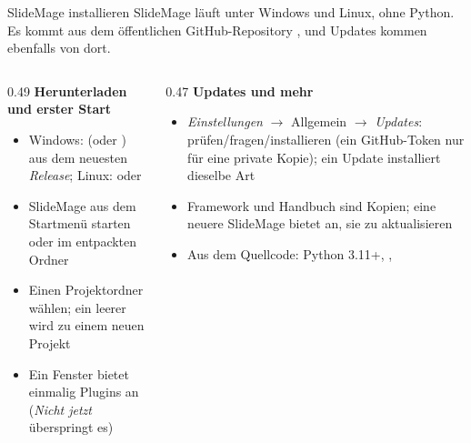

\begin{standardframe}{SlideMage installieren}
	\small
	SlideMage läuft unter Windows und Linux, ohne Python. Es kommt aus dem öffentlichen
	GitHub-Repository , und Updates kommen ebenfalls von dort.
	\par\medskip
	\begin{columns}[T,onlytextwidth]
		\begin{column}{0.49\linewidth}
			\textbf{Herunterladen und erster Start}
			\begin{itemize}
				\item Windows:  (oder ) aus dem neuesten \emph{Release}; Linux:  oder 
				\item SlideMage aus dem Startmenü starten oder  im entpackten Ordner
				\item Einen Projektordner wählen; ein leerer wird zu einem neuen Projekt
				\item Ein Fenster bietet einmalig Plugins an (\emph{Nicht jetzt} überspringt es)
			\end{itemize}
		\end{column}
		\begin{column}{0.47\linewidth}
			\textbf{Updates und mehr}
			\begin{itemize}
				\item \emph{Einstellungen} $\rightarrow$ Allgemein $\rightarrow$ \emph{Updates}: prüfen/fragen/installieren (ein GitHub-Token nur für eine private Kopie); ein Update installiert dieselbe Art
				\item Framework und Handbuch sind Kopien; eine neuere SlideMage bietet an, sie zu aktualisieren
				\item Aus dem Quellcode: Python 3.11+, , 
			\end{itemize}
		\end{column}
	\end{columns}
\end{standardframe}
